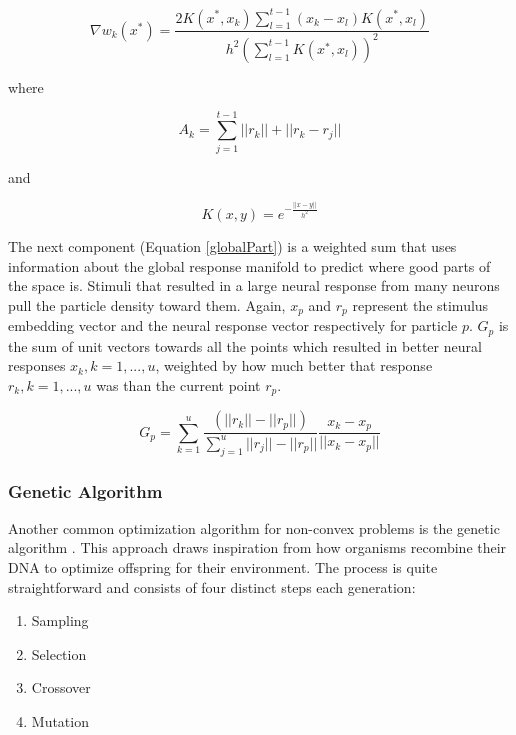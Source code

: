 \begin{equation}
	\nabla w_k (x^* )=\frac{2K(x^*,x_k) \sum_{l=1}^{t-1} (x_k-x_l)K(x^*,x_l)} {h^2\left(\sum_{l=1}^{t-1}K(x^*, x_l)\right)^2}
\end{equation}

where

\begin{equation}
	A_k = \sum_{j=1}^{t-1}||r_k||+||r_k-r_j||
\end{equation}

and

\begin{equation}
	K(x,y)=e^{- \frac{||x-y||}{h^2}}
\end{equation}

The next component (Equation \ref{globalPart}) is a weighted sum that uses information about the global response manifold to predict where good parts of the space is. Stimuli that resulted in a large neural response from many neurons pull the particle density toward them. Again, $x_p$ and $r_p$ represent the stimulus embedding vector and the neural response vector respectively for particle $p$. $G_p$ is the sum of unit vectors towards all the points which resulted in better neural responses $x_k, k = 1,...,u$, weighted by how much better that response $r_k, k = 1,...,u$ was than the current point $r_p$.

\begin{equation}
	G_p = \sum_{k=1}^{u}\frac{(||r_k||-||r_p||)}{\sum_{j=1}^{u}||r_j||-||r_p||} \frac {x_k-x_p}{||x_k-x_p||}\label{globalPart}
\end{equation}

\subsubsection*{Genetic Algorithm}
Another common optimization algorithm for non-convex problems is the genetic algorithm \parencite{Katoch2021}. This approach draws inspiration from how organisms recombine their DNA to optimize offspring for their environment. The process is quite straightforward and consists of four distinct steps each generation:

\begin{enumerate}
	\item Sampling
	\item Selection
	\item Crossover
	\item Mutation
\end{enumerate}


